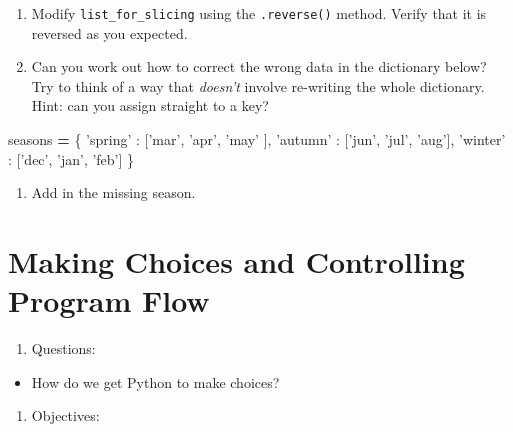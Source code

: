 \documentclass[]{book}
\newenvironment{Shaded}{\begin{snugshade}}{\end{snugshade}}
\newcommand{\NormalTok}[1]{#1}
\newcommand{\OperatorTok}[1]{\textcolor[rgb]{0.81,0.36,0.00}{\textbf{#1}}}
\newcommand{\StringTok}[1]{\textcolor[rgb]{0.31,0.60,0.02}{#1}}
\providecommand{\tightlist}{%
  \setlength{\itemsep}{0pt}\setlength{\parskip}{0pt}}
\theoremstyle{definition}
\theoremstyle{definition}
\theoremstyle{definition}
\theoremstyle{remark}
\begin{document}
\begin{enumerate}
\def\labelenumi{\arabic{enumi}.}
\setcounter{enumi}{1}
\item
  Modify \texttt{list\_for\_slicing} using the \texttt{.reverse()}
  method. Verify that it is reversed as you expected.
\item
  Can you work out how to correct the wrong data in the dictionary
  below? Try to think of a way that \emph{doesn't} involve re-writing
  the whole dictionary. Hint: can you assign straight to a key?
\end{enumerate}

\begin{Shaded}
\begin{Highlighting}[]
\NormalTok{seasons }\OperatorTok{=}\NormalTok{ \{}
  \StringTok{'spring'}\NormalTok{ : [}\StringTok{'mar'}\NormalTok{, }\StringTok{'apr'}\NormalTok{, }\StringTok{'may'}\NormalTok{ ],}
  \StringTok{'autumn'}\NormalTok{ : [}\StringTok{'jun'}\NormalTok{, }\StringTok{'jul'}\NormalTok{, }\StringTok{'aug'}\NormalTok{],}
  \StringTok{'winter'}\NormalTok{ : [}\StringTok{'dec'}\NormalTok{, }\StringTok{'jan'}\NormalTok{, }\StringTok{'feb'}\NormalTok{]}
\NormalTok{\}}
\end{Highlighting}
\end{Shaded}

\begin{enumerate}
\def\labelenumi{\arabic{enumi}.}
\setcounter{enumi}{3}
\tightlist
\item
  Add in the missing season.
\end{enumerate}

\hypertarget{making-choices-and-controlling-program-flow}{%
\chapter{Making Choices and Controlling Program
Flow}\label{making-choices-and-controlling-program-flow}}

\begin{enumerate}
\def\labelenumi{\arabic{enumi}.}
\tightlist
\item
  Questions:
\end{enumerate}

\begin{itemize}
\tightlist
\item
  How do we get Python to make choices?
\end{itemize}

\begin{enumerate}
\def\labelenumi{\arabic{enumi}.}
\setcounter{enumi}{1}
\tightlist
\item
  Objectives:
\end{enumerate}
\end{document}
